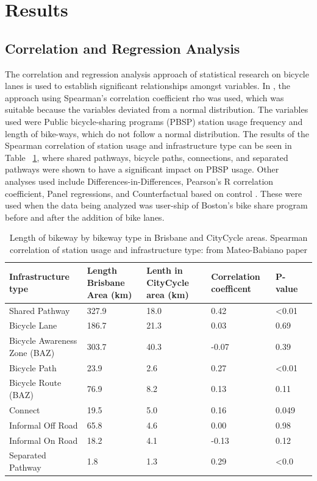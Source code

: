 \documentclass[12pt, letterpaper]{article}
\begin{document}
\section{Results}
\label{sec:results}

\subsection{Correlation and Regression Analysis}
\label{sec:corr}

The correlation and regression analysis approach of statistical research on bicycle lanes is used to establish significant relationships amongst variables. In \citet{1MateoBabiano2016}, the approach using Spearman's correlation coefficient rho was used, which was suitable because the variables deviated from a normal distribution. The variables used were Public bicycle-sharing programs (PBSP) station usage frequency and length of bike-ways, which do not follow a normal distribution. The results of the Spearman correlation of station usage and infrastructure type can be seen in Table ~\ref{table:MB}, where shared pathways, bicycle paths, connections, and separated pathways were shown to have a significant impact on PBSP usage. 
Other analyses used include Differences-in-Differences, Pearson's R correlation coefficient, Panel regressions, and Counterfactual based on control \cite{Karpinski2021}. These were used when the data being analyzed was user-ship of Boston's bike share program before and after the addition of bike lanes. 



\begin{table}[tbp]
\small
\label{table:MB}
\centering
\caption{Length of bikeway by bikeway type in Brisbane and CityCycle areas. Spearman correlation of station usage and infrastructure type: from Mateo-Babiano paper}
\begin{tabular}{l*{5}{p{1.5cm}}}
\toprule
{Infrastructure type} & {Length Brisbane Area (km)} & {Lenth in CityCycle area (km)} & {Correlation coefficent} & {P-value}\\
\midrule
Shared Pathway & 327.9 & 18.0 & 0.42 & <0.01 \\
Bicycle Lane & 186.7 & 21.3 & 0.03 & 0.69 \\
Bicycle Awareness Zone (BAZ) & 303.7 & 40.3 & -0.07 & 0.39 \\
Bicycle Path & 23.9 & 2.6 & 0.27 & <0.01 \\
Bicycle Route (BAZ) & 76.9 & 8.2 & 0.13 & 0.11 \\
Connect & 19.5 & 5.0 & 0.16 & 0.049 \\
Informal Off Road & 65.8 & 4.6 & 0.00 & 0.98 \\
Informal On Road & 18.2 & 4.1 & -0.13 & 0.12 \\
Separated Pathway & 1.8 & 1.3 & 0.29 & <0.0 \\
\bottomrule
\end{tabular}
\end{table}
\end{document}
